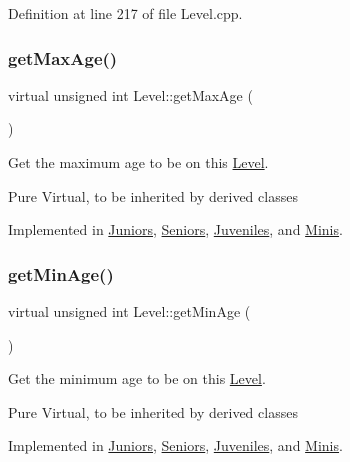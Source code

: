 Definition at line 217 of file Level.\+cpp.

\hypertarget{class_level_ae7b28ba0cb8d49372c4657fbe42706e1}{}\label{class_level_ae7b28ba0cb8d49372c4657fbe42706e1} 
\subsubsection{\texorpdfstring{get\+Max\+Age()}{getMaxAge()}}
{\footnotesize\ttfamily virtual unsigned int Level\+::get\+Max\+Age (\begin{DoxyParamCaption}{ }\end{DoxyParamCaption})\hspace{0.3cm}{\ttfamily [pure virtual]}}



Get the maximum age to be on this \hyperlink{class_level}{Level}. 

Pure Virtual, to be inherited by derived classes 

Implemented in \hyperlink{class_juniors_a98c28047a2d5ff2b14651ee9eccfd2b6}{Juniors}, \hyperlink{class_seniors_a856a5d37a9dbda1e1b3ad8eb90db1f2a}{Seniors}, \hyperlink{class_juveniles_a6b7825beb91d790fc5432902aedcc1fc}{Juveniles}, and \hyperlink{class_minis_a995e2db860e3a5c110cbead80ab61caa}{Minis}.

\hypertarget{class_level_a161cf8c238fd499c112d90504cb6f587}{}\label{class_level_a161cf8c238fd499c112d90504cb6f587} 
\subsubsection{\texorpdfstring{get\+Min\+Age()}{getMinAge()}}
{\footnotesize\ttfamily virtual unsigned int Level\+::get\+Min\+Age (\begin{DoxyParamCaption}{ }\end{DoxyParamCaption})\hspace{0.3cm}{\ttfamily [pure virtual]}}



Get the minimum age to be on this \hyperlink{class_level}{Level}. 

Pure Virtual, to be inherited by derived classes 

Implemented in \hyperlink{class_juniors_a3110bdbaa344b2bfefa2ddcb8be8d7c6}{Juniors}, \hyperlink{class_seniors_a1843edaf8811f4728f76c11c79fe5450}{Seniors}, \hyperlink{class_juveniles_a033b591527e3398a05da40e5ab954b40}{Juveniles}, and \hyperlink{class_minis_a062e99b463e0dd1e370b46e6fb37087a}{Minis}.

